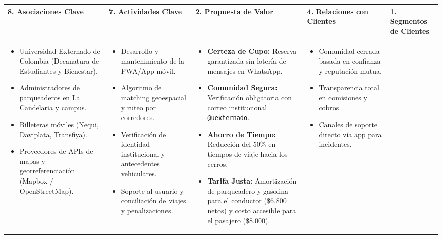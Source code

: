 \documentclass[11pt,a4paper]{article}
\begin{document}
\begin{table}[h!]
\centering
\scriptsize
\begin{tabularx}{\linewidth}{|X|X|X|X|X|}
\hline
\rowcolor{primary!15}
\textbf{8. Asociaciones Clave} & 
\textbf{7. Actividades Clave} & 
\textbf{2. Propuesta de Valor} & 
\textbf{4. Relaciones con Clientes} & 
\textbf{1. Segmentos de Clientes} \\ 
\hline
\begin{itemize}[leftmargin=*]
    \item Universidad Externado de Colombia (Decanatura de Estudiantes y Bienestar).
    \item Administradores de parqueaderos en La Candelaria y campus.
    \item Billeteras móviles (Nequi, Daviplata, Transfiya).
    \item Proveedores de APIs de mapas y georreferenciación (Mapbox / OpenStreetMap).
\end{itemize} & 
\begin{itemize}[leftmargin=*]
    \item Desarrollo y mantenimiento de la PWA/App móvil.
    \item Algoritmo de matching geoespacial y ruteo por corredores.
    \item Verificación de identidad institucional y antecedentes vehiculares.
    \item Soporte al usuario y conciliación de viajes y penalizaciones.
\end{itemize} & 
\begin{itemize}[leftmargin=*]
    \item \textbf{Certeza de Cupo:} Reserva garantizada sin lotería de mensajes en WhatsApp.
    \item \textbf{Comunidad Segura:} Verificación obligatoria con correo institucional \texttt{@uexternado}.
    \item \textbf{Ahorro de Tiempo:} Reducción del 50\% en tiempos de viaje hacia los cerros.
    \item \textbf{Tarifa Justa:} Amortización de parqueadero y gasolina para el conductor (\$6.800 netos) y costo accesible para el pasajero (\$8.000).
\end{itemize} & 
\begin{itemize}[leftmargin=*]
    \item Comunidad cerrada basada en confianza y reputación mutua.
    \item Transparencia total en comisiones y cobros.
    \item Canales de soporte directo vía app para incidentes.

\end{itemize}
\end{tabularx}
\end{table}
\end{document}
